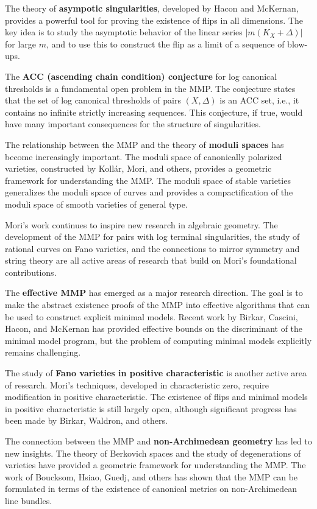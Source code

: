 The theory of \textbf{asympotic singularities}, developed by Hacon and McKernan,
provides a powerful tool for proving the existence of flips in all dimensions.
The key idea is to study the asymptotic behavior of the linear series $|m(K_X +
\Delta)|$ for large $m$, and to use this to construct the flip as a limit of
a sequence of blow-ups.

The \textbf{ACC (ascending chain condition) conjecture} for log canonical thresholds
is a fundamental open problem in the MMP. The conjecture states that the set of
log canonical thresholds of pairs $(X, \Delta)$ is an ACC set, i.e., it contains
no infinite strictly increasing sequences. This conjecture, if true, would have
many important consequences for the structure of singularities.

The relationship between the MMP and the theory of \textbf{moduli spaces} has
become increasingly important. The moduli space of canonically polarized
varieties, constructed by Koll\'ar, Mori, and others, provides a geometric
framework for understanding the MMP. The moduli space of stable varieties
generalizes the moduli space of curves and provides a compactification of the
moduli space of smooth varieties of general type.

Mori's work continues to inspire new research in algebraic geometry. The
development of the MMP for pairs with log terminal singularities, the study of
rational curves on Fano varieties, and the connections to mirror symmetry and
string theory are all active areas of research that build on Mori's
foundational contributions.

The \textbf{effective MMP} has emerged as a major research direction. The goal
is to make the abstract existence proofs of the MMP into effective algorithms
that can be used to construct explicit minimal models. Recent work by
Birkar, Cascini, Hacon, and McKernan has provided effective bounds on the
discriminant of the minimal model program, but the problem of computing minimal
models explicitly remains challenging.

The study of \textbf{Fano varieties in positive characteristic} is another active
area of research. Mori's techniques, developed in characteristic zero, require
modification in positive characteristic. The existence of flips and minimal
models in positive characteristic is still largely open, although significant
progress has been made by Birkar, Waldron, and others.

The connection between the MMP and \textbf{non-Archimedean geometry} has led to
new insights. The theory of Berkovich spaces and the study of degenerations of
varieties have provided a geometric framework for understanding the MMP. The
work of Boucksom, Hsiao, Guedj, and others has shown that the MMP can be
formulated in terms of the existence of canonical metrics on non-Archimedean
line bundles.

